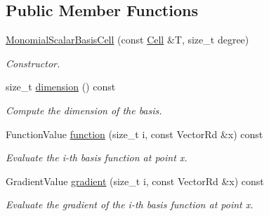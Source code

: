 \subsection*{Public Member Functions}
\begin{DoxyCompactItemize}
\item 
\hyperlink{classHArDCore2D_1_1MonomialScalarBasisCell_a077d11dc2b2d74d11b72f165dc8d033a}{Monomial\+Scalar\+Basis\+Cell} (const \hyperlink{classHArDCore2D_1_1Cell}{Cell} \&T, size\+\_\+t degree)
\begin{DoxyCompactList}\small\item\em Constructor. \end{DoxyCompactList}\item 
\mbox{\label{classHArDCore2D_1_1MonomialScalarBasisCell_a79a3220472fbc88d100be37ea1503d3e}} 
size\+\_\+t \hyperlink{classHArDCore2D_1_1MonomialScalarBasisCell_a79a3220472fbc88d100be37ea1503d3e}{dimension} () const
\begin{DoxyCompactList}\small\item\em Compute the dimension of the basis. \end{DoxyCompactList}\item 
\mbox{\label{classHArDCore2D_1_1MonomialScalarBasisCell_a82562e20ba49b9e72e04c6a7660b1d3c}} 
Function\+Value \hyperlink{classHArDCore2D_1_1MonomialScalarBasisCell_a82562e20ba49b9e72e04c6a7660b1d3c}{function} (size\+\_\+t i, const Vector\+Rd \&x) const
\begin{DoxyCompactList}\small\item\em Evaluate the i-\/th basis function at point x. \end{DoxyCompactList}\item 
\mbox{\label{classHArDCore2D_1_1MonomialScalarBasisCell_a34784e2233789bed6214488ff9e4166d}} 
Gradient\+Value \hyperlink{classHArDCore2D_1_1MonomialScalarBasisCell_a34784e2233789bed6214488ff9e4166d}{gradient} (size\+\_\+t i, const Vector\+Rd \&x) const
\begin{DoxyCompactList}\small\item\em Evaluate the gradient of the i-\/th basis function at point x. \end{DoxyCompactList}\end{DoxyCompactItemize}
